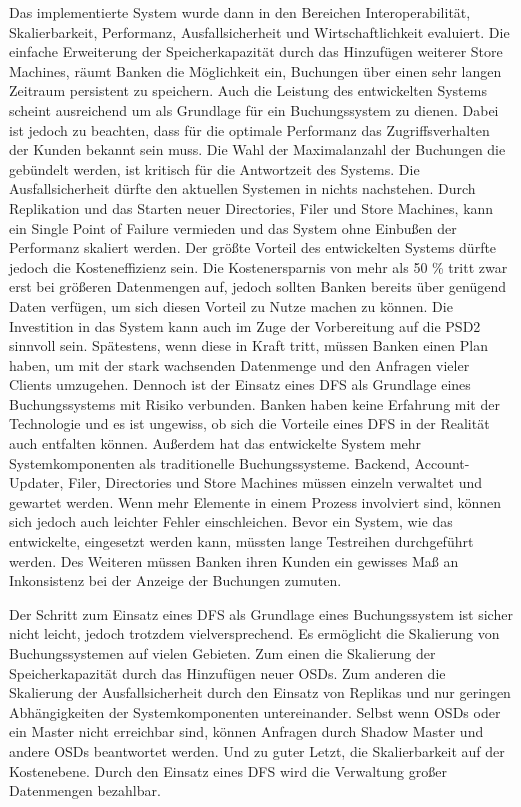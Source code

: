 \documentclass[12pt,oneside,a4paper,parskip]{scrbook}
\begin{document}
Das implementierte System wurde dann in den Bereichen Interoperabilität, Skalierbarkeit, Performanz, Ausfallsicherheit und Wirtschaftlichkeit evaluiert. Die einfache Erweiterung der Speicherkapazität durch das Hinzufügen weiterer Store Machines, räumt Banken die Möglichkeit ein, Buchungen über einen sehr langen Zeitraum persistent zu speichern. Auch die Leistung des entwickelten Systems scheint ausreichend um als Grundlage für ein Buchungssystem zu dienen. Dabei ist jedoch zu beachten, dass für die optimale Performanz das Zugriffsverhalten der Kunden bekannt sein muss. Die Wahl der Maximalanzahl der Buchungen die gebündelt werden, ist kritisch für die Antwortzeit des Systems. Die Ausfallsicherheit dürfte den aktuellen Systemen in nichts nachstehen. Durch Replikation und das Starten neuer Directories, Filer und Store Machines, kann ein Single Point of Failure vermieden und das System ohne Einbußen der Performanz skaliert werden. Der größte Vorteil des entwickelten Systems dürfte jedoch die Kosteneffizienz sein. Die Kostenersparnis von mehr als 50 \% tritt zwar erst bei größeren Datenmengen auf, jedoch sollten Banken bereits über genügend Daten verfügen, um sich diesen Vorteil zu Nutze machen zu können. Die Investition in das System kann auch im Zuge der Vorbereitung auf die PSD2 sinnvoll sein. Spätestens, wenn diese in Kraft tritt, müssen Banken einen Plan haben, um mit der stark wachsenden Datenmenge und den Anfragen vieler Clients umzugehen. Dennoch ist der Einsatz eines DFS als Grundlage eines Buchungssystems mit Risiko verbunden. Banken haben keine Erfahrung mit der Technologie und es ist ungewiss, ob sich die Vorteile eines DFS in der Realität auch entfalten können. Außerdem hat das entwickelte System mehr Systemkomponenten als traditionelle Buchungssysteme. Backend, Account-Updater, Filer, Directories und Store Machines müssen einzeln verwaltet und gewartet werden. Wenn mehr Elemente in einem Prozess involviert sind, können sich jedoch auch leichter Fehler einschleichen. Bevor ein System, wie das entwickelte, eingesetzt werden kann, müssten lange Testreihen durchgeführt werden. Des Weiteren müssen Banken ihren Kunden ein gewisses Maß an Inkonsistenz bei der Anzeige der Buchungen zumuten. 

Der Schritt zum Einsatz eines DFS als Grundlage eines Buchungssystem ist sicher nicht leicht, jedoch trotzdem vielversprechend. Es ermöglicht die Skalierung von Buchungssystemen auf vielen Gebieten.
Zum einen die Skalierung der Speicherkapazität durch das Hinzufügen neuer OSDs. Zum anderen die Skalierung der Ausfallsicherheit durch den Einsatz von Replikas und nur geringen Abhängigkeiten der Systemkomponenten untereinander. Selbst wenn OSDs oder ein Master nicht erreichbar sind, können Anfragen durch Shadow Master und andere OSDs beantwortet werden. Und zu guter Letzt, die Skalierbarkeit auf der Kostenebene. Durch den Einsatz eines DFS wird die Verwaltung großer Datenmengen bezahlbar.
\end{document}
